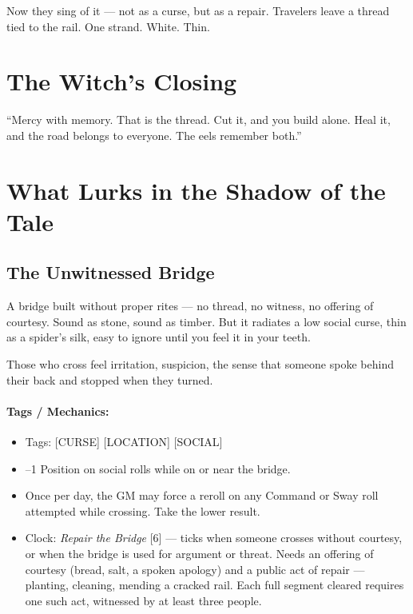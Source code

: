 Now they sing of it --- not as a curse, but as a repair. Travelers leave a thread tied to the rail. One strand. White. Thin.

\section*{The Witch's Closing}

``Mercy with memory. That is the thread. Cut it, and you build alone. Heal it, and the road belongs to everyone. The eels remember both.''

\section*{What Lurks in the Shadow of the Tale}

\subsection*{The Unwitnessed Bridge}

A bridge built without proper rites --- no thread, no witness, no offering of courtesy. Sound as stone, sound as timber. But it radiates a low social curse, thin as a spider's silk, easy to ignore until you feel it in your teeth.

Those who cross feel irritation, suspicion, the sense that someone spoke behind their back and stopped when they turned.

\paragraph{Tags / Mechanics:}

\begin{itemize}
\item Tags: [CURSE] [LOCATION] [SOCIAL]
\item --1 Position on social rolls while on or near the bridge.
\item Once per day, the GM may force a reroll on any Command or Sway roll attempted while crossing. Take the lower result.
\item Clock: \textit{Repair the Bridge} [6] --- ticks when someone crosses without courtesy, or when the bridge is used for argument or threat. Needs an offering of courtesy (bread, salt, a spoken apology) and a public act of repair --- planting, cleaning, mending a cracked rail. Each full segment cleared requires one such act, witnessed by at least three people.
\end{itemize}

